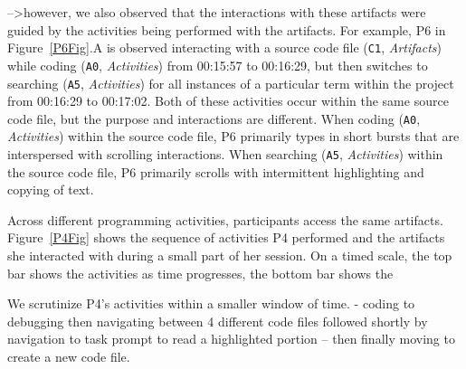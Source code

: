 -->however, we also observed that the interactions with these artifacts were guided by the activities being performed with the artifacts. For example, P6 in Figure~\ref{P6Fig}.A is observed interacting with a source code file (\texttt{C1}, \textit{Artifacts}) while coding (\texttt{A0}, \textit{Activities}) from 00:15:57 to 00:16:29, but then switches to searching (\texttt{A5}, \textit{Activities}) for all instances of a particular term within the project from 00:16:29 to 00:17:02. Both of these activities occur within the same source code file, but the purpose and interactions are different. When coding (\texttt{A0}, \textit{Activities}) within the source code file, P6 primarily types in short bursts that are interspersed with scrolling interactions. When searching (\texttt{A5}, \textit{Activities}) within the source code file, P6 primarily scrolls with intermittent highlighting and copying of text.





Across different programming activities, participants access the same artifacts. Figure~\ref{P4Fig} shows the sequence of activities P4 performed and the artifacts she interacted with during a small part of her session. On a timed scale, the top bar shows the activities as time progresses, the bottom bar shows the   

We scrutinize P4's activities within a smaller window of time.
- coding to debugging then navigating between 4 different code files followed shortly by navigation to task prompt to read a highlighted portion -- then finally moving to create a new code file.




